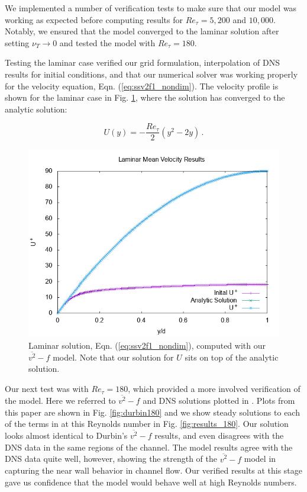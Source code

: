 \documentclass[a4paper,11pt]{article}
\begin{document}
We implemented a number of verification tests to make sure that our model was
working as expected before computing results for $Re_\tau = 5,200$ and
$10,000$. Notably, we ensured that the model converged to the laminar solution
after setting $\nu_T \rightarrow 0$ and tested the model with $Re_\tau = 180$. 


Testing the laminar case verified our grid formulation, interpolation of DNS
results for initial conditions, and that our numerical solver was working
properly for the velocity equation, Eqn.
(\ref{eq:ssv2f1_nondim}). The velocity profile is shown for the laminar case in Fig.
\ref{fig:laminar}, where the solution has converged to the analytic
solution: 

\begin{equation*}
  U(y) = -\frac{Re_\tau}{2}\left(y^2 - 2y\right) \, .
\end{equation*}

\begin{figure}
 \centering
 \includegraphics[width=.7\textwidth]{laminar}
 \caption{Laminar solution, Eqn. (\ref{eq:ssv2f1_nondim}), computed with
our $\overline{v^2}-f$ model. Note that our solution for $U$ sits on top of the
analytic solution.}
 \label{fig:laminar}
\end{figure}


Our next test was with $Re_\tau = 180$, which provided a more involved
verification of the model. Here we referred to $\overline{v^2} - f$ and DNS
solutions plotted in \cite{durbin180}. Plots from this paper are shown in Fig.
\ref{fig:durbin180} and we show steady solutions to each of the terms in
at this Reynolds number in Fig. \ref{fig:results_180}. Our solution looks almost
identical to Durbin's $\overline{v^2}-f$ results, and even disagrees with the DNS
data in the same regions of the channel. The model results agree with the DNS
data quite well, however, showing the strength of the $\overline{v^2}-f$ model
in capturing the near wall behavior in channel flow. Our verified results at
this stage gave us confidence that the model would behave well at high Reynolds
numbers.
\end{document}
